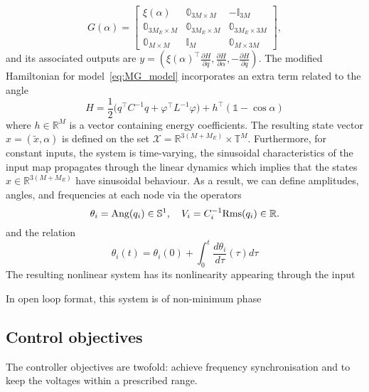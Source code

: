 \documentclass[journal, final, letterpaper]{IEEEtran}
\newcommand{\ts}[1]{{\textnormal{#1}}}
\newcommand{\diff}[2]{{\frac{d #1}{d #2}}}
\newcommand{\pdiff}[2]{{\frac{\partial #1}{\partial #2}}}
\newcommand{\Rset}{\mathbb{R}}
\newcommand{\mc}{\mathcal}
\newcommand{\mbb}{\mathbb}
\begin{document}
 \[
 G(\alpha) = \begin{bmatrix} \xi(\alpha) & \mbb{0}_{3M\times M} & -\mbb{I}_{3M}\\ \mbb{0}_{3M_E\times M} & \mbb{0}_{3M_E\times M} & \mbb{0}_{3M_E\times 3M}\\\mbb{0}_{M\times M} & \mbb{I}_{M} & \mbb{0}_{M\times 3M}\end{bmatrix},
 \]
and its associated outputs are $y = (\xi(\alpha)^\top\pdiff{H}{q},\pdiff{H}{\alpha},-\pdiff{H}{q})$. The modified Hamiltonian for model~\eqref{eq:MG_model} incorporates an extra term related to the angle
%
\begin{equation}
  H = \frac{1}{2}\bigl ( q^\top C^{-1}q +\varphi^\top L^{-1}\varphi  \bigr ) + h^\top(\mbb{1} - \cos\alpha)
\label{eq:Hamiltonian_MG}  
\end{equation}
%
 where $h\in\Rset^M$ is a vector containing energy coefficients. The resulting state vector $x = (\tilde{x},\alpha)$ is defined on the set $\mc{X} = \Rset^{3(M+M_E)}\times\mbb{T}^M$. Furthermore, for constant inputs, the system is time-varying, the sinusoidal characteristics of the input map propagates through the linear dynamics which implies that the states $x\in\Rset ^{3(M+M_E)}$ have sinusoidal behaviour. As a result, we can define amplitudes, angles, and frequencies at each node via the operators 
\begin{equation}
 \theta_i = \ts{Ang}(q_i)\in\mbb{S}^1,\quad V_i = C_i^{-1}\ts{Rms}(q_i)\in\Rset.
\label{eq:angle_rms}  
\end{equation}
%
and the relation 
%
\begin{equation}
	\theta_i(t) = \theta_i(0) + \int_0^t\diff{\theta_i}{\tau}(\tau)d\tau 
\label{eq:angle}  
\end{equation}
%
 The resulting nonlinear system has its nonlinearity appearing through the input
 

 
 In open loop format, this system is of non-minimum phase 
%
\subsection{Control objectives}
\label{sec:control_objectives}
%


The controller objectives are twofold: achieve frequency synchronisation and to keep the voltages within a prescribed range. 
\end{document}
